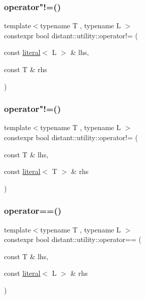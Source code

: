 \mbox{\label{namespacedistant_1_1utility_a89c1a1b05b4b8183ae5e6d1469e5d9e8}} 
\subsubsection{\texorpdfstring{operator"!=()}{operator!=()}\hspace{0.1cm}{\footnotesize\ttfamily [1/2]}}
{\footnotesize\ttfamily template$<$typename T , typename L $>$ \\
constexpr bool distant\+::utility\+::operator!= (\begin{DoxyParamCaption}\item[{const \mbox{\hyperlink{classdistant_1_1utility_1_1literal}{literal}}$<$ L $>$ \&}]{lhs,  }\item[{const T \&}]{rhs }\end{DoxyParamCaption})}

\mbox{\label{namespacedistant_1_1utility_a749461c752fcab50ca1c5d94a5951419}} 
\subsubsection{\texorpdfstring{operator"!=()}{operator!=()}\hspace{0.1cm}{\footnotesize\ttfamily [2/2]}}
{\footnotesize\ttfamily template$<$typename T , typename L $>$ \\
constexpr bool distant\+::utility\+::operator!= (\begin{DoxyParamCaption}\item[{const T \&}]{lhs,  }\item[{const \mbox{\hyperlink{classdistant_1_1utility_1_1literal}{literal}}$<$ T $>$ \&}]{rhs }\end{DoxyParamCaption})}

\mbox{\label{namespacedistant_1_1utility_af5871a624732649e33373fc90355cd46}} 
\subsubsection{\texorpdfstring{operator==()}{operator==()}\hspace{0.1cm}{\footnotesize\ttfamily [1/2]}}
{\footnotesize\ttfamily template$<$typename T , typename L $>$ \\
constexpr bool distant\+::utility\+::operator== (\begin{DoxyParamCaption}\item[{const T \&}]{lhs,  }\item[{const \mbox{\hyperlink{classdistant_1_1utility_1_1literal}{literal}}$<$ L $>$ \&}]{rhs }\end{DoxyParamCaption})}

